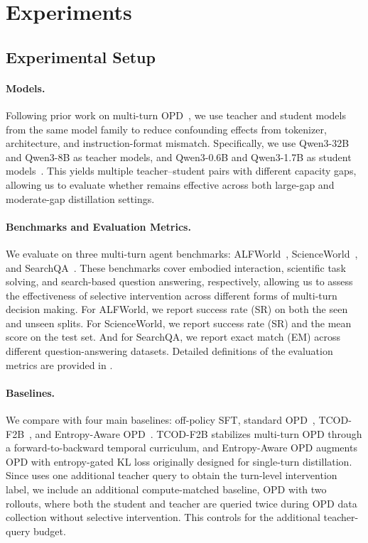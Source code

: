 \section{Experiments}
\label{sec:experiments}

\subsection{Experimental Setup}
\label{sec:setup}

\paragraph{Models.}
Following prior work on multi-turn OPD~\citep{wang2026tcod}, we use teacher and student models from the same model family to reduce confounding effects from tokenizer, architecture, and instruction-format mismatch.
%
Specifically, we use Qwen3-32B and Qwen3-8B as teacher models, and Qwen3-0.6B and Qwen3-1.7B as student models~\citep{yang2025qwen3}. 
%
This yields multiple teacher--student pairs with different capacity gaps, allowing us to evaluate whether \ours remains effective across both large-gap and moderate-gap distillation settings.
%

\paragraph{Benchmarks and Evaluation Metrics.}
We evaluate \ours on three multi-turn agent benchmarks: ALFWorld~\citep{shridhar2020alfworld}, ScienceWorld~\citep{wang2022scienceworld}, and SearchQA~\citep{jin2025search}. 
%
These benchmarks cover embodied interaction, scientific task solving, and search-based question answering, respectively, allowing us to assess the effectiveness of selective intervention across different forms of multi-turn decision making.
%
For ALFWorld, we report success rate (SR) on both the seen and unseen splits. 
%
For ScienceWorld, we report success rate (SR) and the mean score on the test set. 
%
And for SearchQA, we report exact match (EM) across different question-answering datasets. 
%
Detailed definitions of the evaluation metrics are provided in .
%


\paragraph{Baselines.}
We compare \ours with four main baselines: off-policy SFT, standard OPD~\citep{lu2025onpolicydistillation}, TCOD-F2B~\citep{wang2026tcod}, and Entropy-Aware OPD~\citep{jin2026entropy}. 
%
TCOD-F2B stabilizes multi-turn OPD through a forward-to-backward temporal curriculum, and Entropy-Aware OPD augments OPD with entropy-gated KL loss originally designed for single-turn distillation. 
%
Since \ours uses one additional teacher query to obtain the turn-level intervention label, we include an additional compute-matched baseline, OPD with two rollouts, where both the student and teacher are queried twice during OPD data collection without selective intervention. 
%
This controls for the additional teacher-query budget.
%

